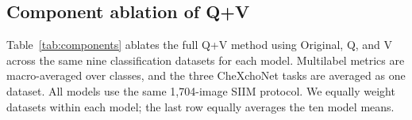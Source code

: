 \documentclass[10pt,twocolumn,letterpaper]{article}
\begin{document}
% 
% 
% 
% 

\subsection{Component ablation of Q+V}
\label{sec:components}

Table~\ref{tab:components} ablates the full Q+V method using Original, Q, and V across the same nine classification datasets for each model. Multilabel metrics are macro-averaged over classes, and the three CheXchoNet tasks are averaged as one dataset. All models use the same 1,704-image SIIM protocol. We equally weight datasets within each model; the last row equally averages the ten model means.
\end{document}
